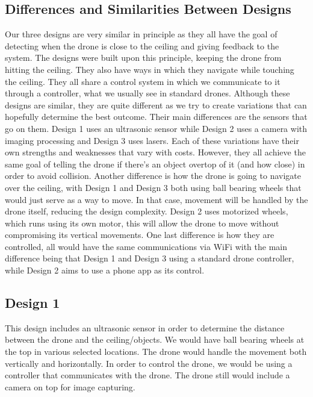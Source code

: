 \documentclass[12pt]{article}
\begin{document}
        \subsection{Differences and Similarities Between Designs}
            Our three designs are very similar in principle as they all have the goal of detecting when the drone is close to the ceiling and giving feedback to the system. The designs were built upon this principle, keeping the drone from hitting the ceiling. They also have ways in which they navigate while touching the ceiling. They all share a control system in which we communicate to it through a controller, what we usually see in standard drones. Although these designs are similar, they are quite different as we try to create variations that can hopefully determine the best outcome. Their main differences are the sensors that go on them. Design 1 uses an ultrasonic sensor while Design 2 uses a camera with imaging processing and Design 3 uses lasers. Each of these variations have their own strengths and weaknesses that vary with costs. However, they all achieve the same goal of telling the drone if there's an object overtop of it (and how close) in order to avoid collision. Another difference is how the drone is going to navigate over the ceiling, with Design 1 and Design 3 both using ball bearing wheels that would just serve as a way to move. In that case, movement will be handled by the drone itself, reducing the design complexity. Design 2 uses motorized wheels, which runs using its own motor, this will allow the drone to move without compromising its vertical movements. One last difference is how they are controlled, all would have the same communications via WiFi with the main difference being that Design 1 and Design 3 using a standard drone controller, while Design 2 aims to use a phone app as its control.

        \newpage
        \subsection{Design 1}
            This design includes an ultrasonic sensor in order to determine the distance between the drone and the ceiling/objects. We would have ball bearing wheels at the top in various selected locations. The drone would handle the movement both vertically and horizontally. In order to control the drone, we would be using a controller that communicates with the drone. The drone still would include a camera on top for image capturing.
\end{document}
